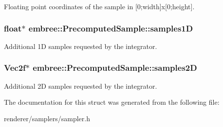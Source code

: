 Floating point coordinates of the sample in \mbox{[}0;width\mbox{]}x\mbox{[}0;height\mbox{]}. 

\hypertarget{structembree_1_1_precomputed_sample_a2043d5a1909742b1601a5e235cbb74b1}{
\subsubsection[{samples1D}]{\setlength{\rightskip}{0pt plus 5cm}float$\ast$ {\bf embree::PrecomputedSample::samples1D}}}
\label{structembree_1_1_precomputed_sample_a2043d5a1909742b1601a5e235cbb74b1}


Additional 1D samples requested by the integrator. 

\hypertarget{structembree_1_1_precomputed_sample_abbe8fc7c30fc8505f82606996032dd3b}{
\subsubsection[{samples2D}]{\setlength{\rightskip}{0pt plus 5cm}Vec2f$\ast$ {\bf embree::PrecomputedSample::samples2D}}}
\label{structembree_1_1_precomputed_sample_abbe8fc7c30fc8505f82606996032dd3b}


Additional 2D samples requested by the integrator. 



The documentation for this struct was generated from the following file:\begin{DoxyCompactItemize}
\item 
renderer/samplers/sampler.h\end{DoxyCompactItemize}
